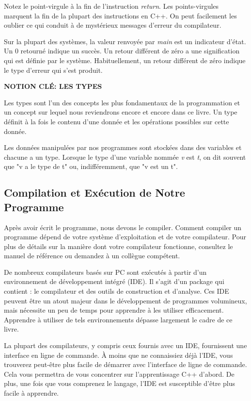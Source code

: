 \begin{shadebox}Notez le point-virgule à la fin de l'instruction \textit{return}. Les points-virgules marquent la fin de la plupart des instructions en C++. On peut facilement les oublier ce qui conduit à de mystérieux messages d'erreur du compilateur.
\end{shadebox}

Sur la plupart des systèmes, la valeur renvoyée par \textit{main} est un indicateur d'état. Un 0 retourné indique un succès. Un retour différent de zéro a une signification qui est définie par le système. Habituellement, un retour différent de zéro indique le type d'erreur qui s'est produit.

\begin{shadebox}
\textbf{NOTION CLÉ: LES TYPES}

Les types sont l'un des concepts les plus fondamentaux de la programmation et un concept sur lequel nous reviendrons encore et encore dans ce livre. Un type définit à la fois le contenu d'une donnée et les opérations possibles sur cette donnée.

Les données manipulées par nos programmes sont stockées dans des variables et chacune a un type. Lorsque le type d'une variable nommée \textit{v} est \textit{t}, on dit souvent que "v a le type de t" ou, indifféremment, que "v est un t".

\end{shadebox}

\subsection{Compilation et Exécution de Notre Programme}
Après avoir écrit le programme, nous devons le compiler. Comment compiler un programme dépend de votre système d'exploitation et de votre compilateur. Pour plus de détails sur la manière dont votre compilateur fonctionne, consultez le manuel de référence ou demandez à un collègue compétent.

De nombreux compilateurs basés sur PC sont exécutés à partir d'un environnement de développement intégré (IDE). Il s'agit d'un package qui contient : le compilateur et des outils de construction et d'analyse. Ces IDE peuvent être un atout majeur dans le développement de programmes volumineux, mais nécessite un peu de temps pour apprendre à les utiliser efficacement. Apprendre à utiliser de tels environnements dépasse largement le cadre de ce livre.

La plupart des compilateurs, y compris ceux fournis avec un IDE, fournissent une interface en ligne de commande. À moins que ne connaissiez déjà l'IDE, vous trouverez peut-être plus facile de démarrer avec l'interface de ligne de commande. Cela vous permettra de vous concentrer sur l'apprentissage C++ d'abord. De plus, une fois que vous comprenez le langage, l'IDE est susceptible d'être plus facile à apprendre.

